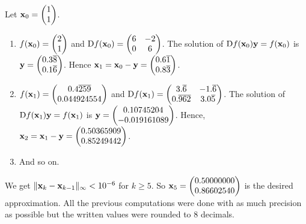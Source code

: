 \begin{egg}
Let $\mathbf{x}_0 = \begin{pmatrix} 1 \\ 1 \end{pmatrix}$.
\begin{enumerate}
\item $f(\mathbf{x}_0) = \begin{pmatrix} 2 \\ 1 \end{pmatrix}$ and
$\mathrm{D} f(\mathbf{x}_0) =  \begin{pmatrix} 6 & -2 \\ 0 & 6 \end{pmatrix}$.
The solution of $\mathrm{D} f(\mathbf{x}_0)\mathbf{y} = f(\mathbf{x}_0)$ is
$\mathbf{y} =  \begin{pmatrix} 0.3\overline{8} \\
0.1\overline{6} \end{pmatrix}$.  Hence
$\mathbf{x}_1 = \mathbf{x}_0 - \mathbf{y} =  \begin{pmatrix} 0.6\overline{1} \\
0.8\overline{3} \end{pmatrix}$.
\item $f(\mathbf{x}_1) = \begin{pmatrix} 0.4\overline{259} \\ 0.044924554
\end{pmatrix}$ and $\mathrm{D} f(\mathbf{x}_1) =
\begin{pmatrix} 3.\overline{6} & -1.\overline{6} \\
0.\overline{962} & 3.0\overline{5}
\end{pmatrix}$.
The solution of $\mathrm{D} f(\mathbf{x}_1)\mathbf{y} = f(\mathbf{x}_1)$ is
$\mathbf{y} =  \begin{pmatrix} 0.10745204 \\ -0.019161089
\end{pmatrix}$.
Hence, $\mathbf{x}_2 = \mathbf{x}_1 - \mathbf{y} =
\begin{pmatrix} 0.50365909 \\ 0.85249442 \end{pmatrix}$.
\item And so on.
\end{enumerate}
We get
$\|\mathbf{x}_k - \mathbf{x}_{k-1}\|_\infty < 10^{-6}$ for $k\geq 5$.
So $\mathbf{x}_5 = \begin{pmatrix} 0.50000000 \\ 0.86602540 \end{pmatrix}$
is the desired approximation.  All the previous computations were done
with as much precision as possible but the written values were rounded
to $8$ decimals.
\end{egg}

